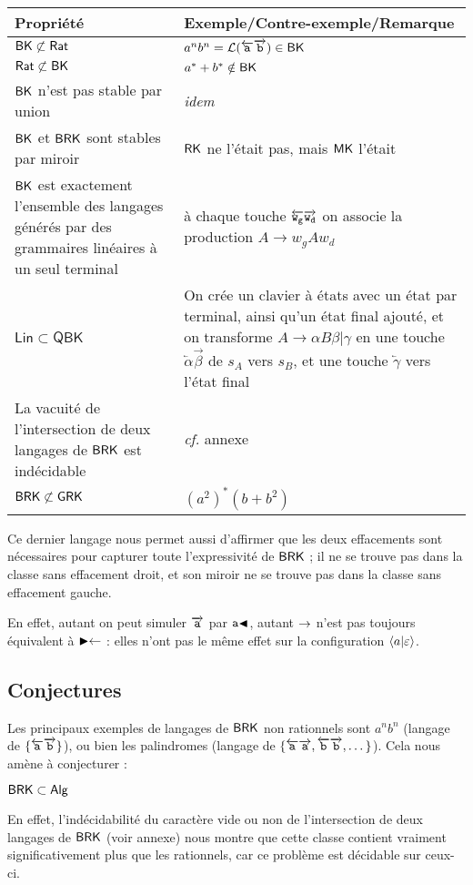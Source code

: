 \documentclass[12pt, a4paper]{article}
\renewcommand{\L}{\mathcal{L}}
\begin{document}
    \begin{tabular}{|p{}|p{}|}
        \hline
        \textbf{Propriété} & \textbf{Exemple/Contre-exemple/Remarque} \\
        \hline
        $\mathsf{BK} \not\subset \mathsf{Rat}$ & $a^nb^n = \L({\egauche{a}\edroite{b}}) \in \BK$ \\
        \hline
        $\mathsf{Rat} \not\subset \mathsf{BK}$ & $a^*+b^* \notin \mathsf{BK}$ \\
        \hline
        $\mathsf{BK}$ n'est pas stable par union & \textit{idem} \\
        \hline
        $\mathsf{BK}$ et $\mathsf{BRK}$ sont stables par miroir & $\mathsf{RK}$ ne l'était pas, mais $\mathsf{MK}$ l'était \\
        \hline
        $\mathsf{BK}$ est exactement l'ensemble des langages générés par des grammaires linéaires à un seul terminal & à chaque touche $\overleftarrow{\mathtt{w_g}}\overrightarrow{\mathtt{w_d}}$ on associe la production $A \rightarrow w_gAw_d$ \\
        \hline
        $\mathsf{Lin} \subset \mathsf{QBK}$ & On crée un clavier à états avec un état par terminal, ainsi qu'un état final ajouté, et on transforme $A \rightarrow \alpha B \beta | \gamma$ en une touche $\overleftarrow{\alpha}\overrightarrow{\beta}$ de $s_A$ vers $s_B$, et une touche $\overleftarrow{\gamma}$ vers l'état final \\
        \hline
        La vacuité de l'intersection de deux langages de $\mathsf{BRK}$ est indécidable & \textit{cf.} annexe \\
        \hline
        $\mathsf{BRK} \not\subset \mathsf{GRK}$ & $(a^2)^*(b+b^2)$ \\
        \hline
    \end{tabular}

    
    Ce dernier langage nous permet aussi d'affirmer que les deux effacements sont nécessaires pour capturer toute l'expressivité de $\mathsf{BRK}$ ; il ne se trouve pas dans la classe sans effacement droit, et son miroir ne se trouve pas dans la classe sans effacement gauche.

    En effet, autant on peut simuler $\overrightarrow{\mathtt{a}}$ par $\mathtt{a}\mathord{\blacktriangleleft}$, autant $\mathord{\rightarrow}$ n'est pas toujours équivalent à $\mathord{\blacktriangleright}\mathord{\leftarrow}$ : elles n'ont pas le même effet sur la configuration $\left\langle a \middle| \varepsilon \right\rangle$.
         
    \subsection{Conjectures}\label{sectionclavsym}
    Les principaux exemples de langages de $\mathsf{BRK}$ non rationnels sont $a^nb^n$ (langage de $\{\overleftarrow{\mathtt{a}}\overrightarrow{\mathtt{b}}\}$), ou bien les palindromes (langage de $\{\overleftarrow{\mathtt{a}}\overrightarrow{\mathtt{a}},\overleftarrow{\mathtt{b}}\overrightarrow{\mathtt{b}}, \dots\}$). Cela nous amène à conjecturer :
    \begin{example}[Conjecture 1]
        $\mathsf{BRK} \subset \mathsf{Alg}$
    \end{example}
    En effet, l'indécidabilité du caractère vide ou non de l'intersection de deux langages de $\mathsf{BRK}$ (voir annexe) nous montre que cette classe contient vraiment significativement plus que les rationnels, car ce problème est décidable sur ceux-ci.
    
\end{document}
